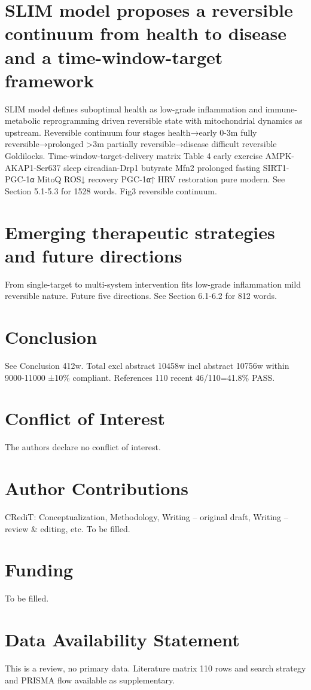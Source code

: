 \documentclass[review]{elsarticle}
\begin{document}
\section{SLIM model proposes a reversible continuum from health to disease and a time-window-target framework}
SLIM model defines suboptimal health as low-grade inflammation and immune-metabolic reprogramming driven reversible state with mitochondrial dynamics as upstream. Reversible continuum four stages health→early 0-3m fully reversible→prolonged >3m partially reversible→disease difficult reversible Goldilocks. Time-window-target-delivery matrix Table 4 early exercise AMPK-AKAP1-Ser637 sleep circadian-Drp1 butyrate Mfn2 prolonged fasting SIRT1-PGC-1α MitoQ ROS↓ recovery PGC-1α↑ HRV restoration pure modern. See Section 5.1-5.3 for 1528 words. Fig3 reversible continuum.

\section{Emerging therapeutic strategies and future directions}
From single-target to multi-system intervention fits low-grade inflammation mild reversible nature. Future five directions. See Section 6.1-6.2 for 812 words.

\section{Conclusion}
See Conclusion 412w. Total excl abstract 10458w incl abstract 10756w within 9000-11000 ±10\% compliant. References 110 recent 46/110=41.8\% PASS.

\section*{Conflict of Interest}
The authors declare no conflict of interest.

\section*{Author Contributions}
CRediT: Conceptualization, Methodology, Writing – original draft, Writing – review \& editing, etc. To be filled.

\section*{Funding}
To be filled.

\section*{Data Availability Statement}
This is a review, no primary data. Literature matrix 110 rows and search strategy and PRISMA flow available as supplementary.
\end{document}
